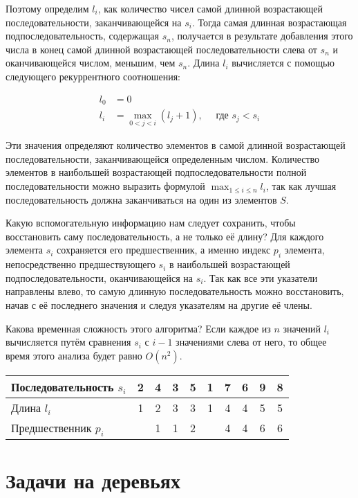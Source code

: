 \documentclass[14pt,openany]{book}
\begin{document}
Поэтому определим $l_i$, как количество чисел самой длинной возрастающей последовательности,
заканчивающейся на $s_i$. Тогда самая длинная возрастающая подпоследовательность, содержащая
$s_n$, получается в результате добавления этого числа в конец самой длинной возрастающей
последовательности слева от $s_n$ и оканчивающейся числом, меньшим, чем $s_n$. Длина $l_i$
вычисляется с помощью следующего рекуррентного соотношения:

\begin{align*}
l_0 &= 0 \\
l_i &= \max_{0<j<i}(l_j + 1), \quad \text{ где $s_j < s_i$}
\end{align*}

Эти значения определяют количество элементов в самой длинной возрастающей последовательности,
заканчивающейся определенным числом. Количество элементов в наибольшей возрастающей
подпоследовательности полной последовательности можно выразить формулой $\max_{1\le i\le n}l_i$,
так как лучшая последовательность должна заканчиваться на один из элементов $S$.

Какую вспомогательную информацию нам следует сохранить, чтобы восстановить саму
последовательность, а не только её длину? Для каждого элемента $s_i$ сохраняется его
предшественник, а именно индекс $p_i$ элемента, непосредственно предшествующего $s_i$
в наибольшей возрастающей подпоследовательности, оканчивающейся на $s_i$. Так как все
эти указатели направлены влево, то самую длинную последовательность можно восстановить,
начав с её последнего значения и следуя указателям на другие её члены.

Какова временная сложность этого алгоритма? Если каждое из $n$ значений $l_i$ вычисляется
путём сравнения $s_i$ с $i-1$ значениями слева от него, то общее время этого анализа
будет равно $O(n^2)$.

\begin{tabular}{l|c|c|c|c|c|c|c|c|c}
Последовательность $s_i$ & 2 & 4 & 3 & 5 & 1 & 7 & 6 & 9 & 8 \\
\hline
Длина $l_i$              & 1 & 2 & 3 & 3 & 1 & 4 & 4 & 5 & 5 \\
\hline
Предшественник $p_i$     &   & 1 & 1 & 2 &   & 4 & 4 & 6 & 6 \\
\end{tabular}




\chapter{Задачи на деревьях}
\end{document}
